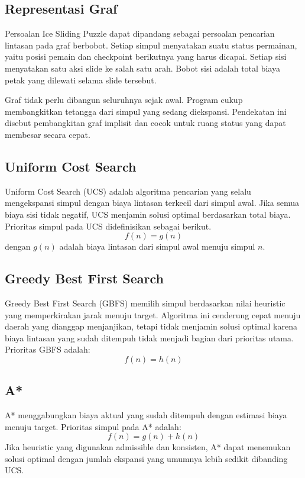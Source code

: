 \subsection{Representasi Graf}\label{sub:Representasi Graf}

Persoalan Ice Sliding Puzzle dapat dipandang sebagai persoalan
pencarian lintasan pada graf berbobot. Setiap simpul menyatakan suatu
status permainan, yaitu posisi pemain dan checkpoint berikutnya yang
harus dicapai. Setiap sisi menyatakan satu aksi slide ke salah satu
arah. Bobot sisi adalah total biaya petak yang dilewati selama slide
tersebut.

Graf tidak perlu dibangun seluruhnya sejak awal. Program cukup
membangkitkan tetangga dari simpul yang sedang diekspansi. Pendekatan
ini disebut pembangkitan graf implisit dan cocok untuk ruang status
yang dapat membesar secara cepat.

\subsection{Uniform Cost Search}\label{sub:UCS}

Uniform Cost Search (UCS) adalah algoritma pencarian yang selalu
mengekspansi simpul dengan biaya lintasan terkecil dari simpul awal.
Jika semua biaya sisi tidak negatif, UCS menjamin solusi optimal
berdasarkan total biaya. Prioritas simpul pada UCS didefinisikan
sebagai berikut.
\[
    f(n) = g(n)
\]
dengan $g(n)$ adalah biaya lintasan dari simpul awal menuju simpul
$n$.

\subsection{Greedy Best First Search}\label{sub:GBFS}

Greedy Best First Search (GBFS) memilih simpul berdasarkan nilai
heuristic yang memperkirakan jarak menuju target. Algoritma ini
cenderung cepat menuju daerah yang dianggap menjanjikan, tetapi tidak
menjamin solusi optimal karena biaya lintasan yang sudah ditempuh
tidak menjadi bagian dari prioritas utama. Prioritas GBFS adalah:
\[
    f(n) = h(n)
\]

\subsection{A*}\label{sub:AStar}

A* menggabungkan biaya aktual yang sudah ditempuh dengan estimasi
biaya menuju target. Prioritas simpul pada A* adalah:
\[
    f(n) = g(n) + h(n)
\]
Jika heuristic yang digunakan admissible dan konsisten, A* dapat
menemukan solusi optimal dengan jumlah ekspansi yang umumnya lebih
sedikit dibanding UCS.


